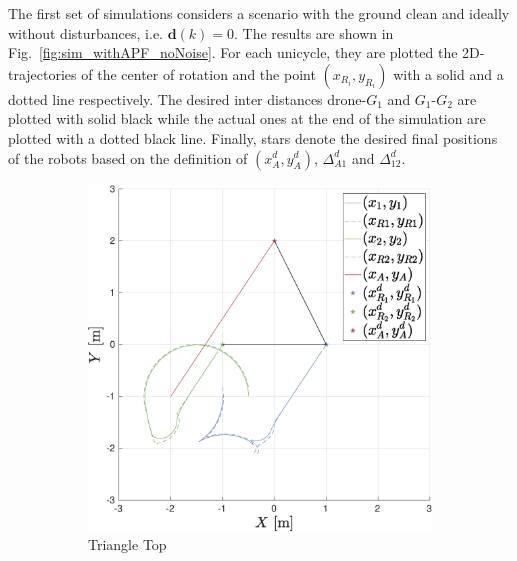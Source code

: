 \documentclass{ifacconf}
\begin{document}
The first set of simulations considers a scenario with the ground clean 
and ideally without disturbances, i.e. $\boldsymbol{d}(k) = 0$.
The results are shown in Fig.~\ref{fig:sim_withAPF_noNoise}.
For each unicycle, they are plotted the 2D-trajectories 
of the center of rotation and the point $(x_{R_i}, y_{R_i})$ 
with a solid and a dotted line respectively.
The desired inter distances drone-$G_1$ and $G_1$-$G_2$ are plotted 
with solid black while the actual ones at the end of the simulation 
are plotted with a dotted black line.
Finally, stars denote the desired final positions of the robots 
based on the definition of $(x^d_A, y^d_A)$, $ \Delta^d_{A1}$ and $\Delta^d_{12}$.
\begin{figure}
    \centering
    \begin{subfigure}[b]{0.32\columnwidth}
        \centering
        \includegraphics[width=\linewidth]{images/simulations/with_APF/not_noisy/1st_scenario_with_noNoise.eps}
         \caption{Triangle Top}
         \label{fig:sim_withAPF_noNoise_1}
    \end{subfigure}
    \begin{subfigure}[b]{0.32\columnwidth}
        \centering

\end{subfigure}
\end{figure}
\end{document}
